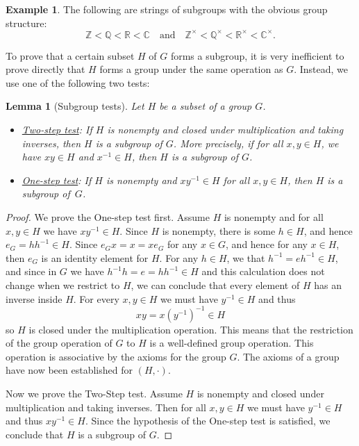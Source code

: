 \documentclass[12pt]{report}
\newtheorem{lemma}[theorem]{Lemma}
\numberwithin{equation}{section}
\numberwithin{theorem}{chapter}
\theoremstyle{definition}
\newtheorem{example}[theorem]{Example}
\newtheorem*{basic properties}{Basic Properties}
\newtheorem*{Important Remark}{Important Remark}
\newcommand{\R}{\mathbb{R}}
\newcommand{\Z}{\mathbb{Z}}
\newcommand{\Q}{\mathbb{Q}}
\newcommand{\C}{\mathbb{C}}
\begin{document}
\begin{example}
The following are strings of subgroups with the obvious group structure: 
$$\Z < \Q < \R < \C \quad \textrm{and} \quad \Z^\times < \Q^\times < \R^\times < \C^\times.$$
\end{example}


To prove that a certain subset $H$ of $G$ forms a subgroup, it is very inefficient to prove directly that $H$ forms a group under the same operation as $G$. Instead, we use one of the following two tests:

\begin{lemma}[Subgroup tests]
Let $H$ be a subset of a group $G$.
\begin{itemize}[leftmargin=10pt]
	\item \underline{Two-step test}:
If $H$ is nonempty and closed under multiplication and taking inverses, then $H$ is a subgroup of $G$. More precisely, if for all $x, y \in H$, we have $xy \in H$ and $x^{-1} \in H$, then $H$ is a subgroup of $G$.
\item \underline{One-step test}:
If $H$ is nonempty and $xy^{-1} \in H$ for all $x,y \in H$, then $H$ is a subgroup of~$G$.
\end{itemize}
\end{lemma}

\begin{proof} 
We prove the One-step test first.
Assume $H$ is nonempty and for all $x,y \in H$ we have $xy^{-1} \in H$. Since $H$ is nonempty, there is some $h \in H$, and hence $e_G = hh^{-1} \in H$. Since $e_Gx=x=xe_G$ for any $x\in G$, and hence for any $x \in H$, then $e_G$ is an identity element for $H$. For any $h \in H$, we that $h^{-1} = eh^{-1} \in H$, and since in $G$ we have $h^{-1}h = e = hh^{-1} \in H$ and this calculation does not change when we restrict to $H$, we can conclude that every element of $H$ has an inverse inside $H$. For every $x,y \in H$ we must have $y^{-1} \in H$ and thus 
$$xy = x(y^{-1})^{-1} \in H$$ 
so $H$ is closed under the multiplication operation. This means that the restriction of the group operation of $G$ to $H$ is a well-defined group operation. This operation is associative by the axioms for the group $G$. The axioms of a group have now been established for $(H, \cdot)$.

Now we prove the Two-Step test.
Assume $H$ is nonempty and closed under multiplication and taking inverses. Then for all $x,y\in H$ we must have $y^{-1}\in H$ and thus $xy^{-1}\in H$. Since the hypothesis of the One-step test is satisfied, we conclude that $H$ is a subgroup of $G$.
\end{proof}
\end{document}
